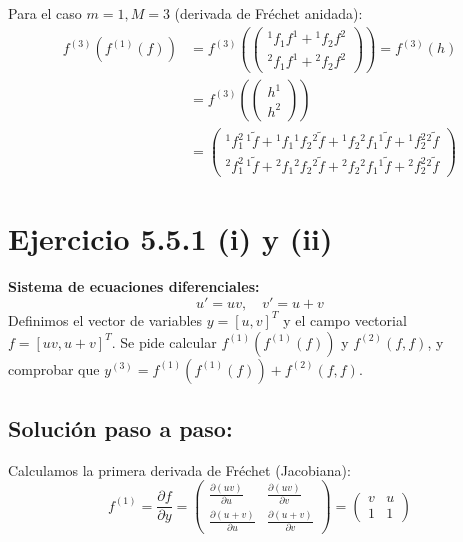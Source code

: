 Para el caso $m=1, M=3$ (derivada de Fréchet anidada):
\begin{align*}
    f^{(3)}\left(f^{(1)}(f)\right) &= f^{(3)}\left( \begin{pmatrix} {^1}f_1 f^1 + {^1}f_2 f^2 \\ {^2}f_1 f^1 + {^2}f_2 f^2 \end{pmatrix} \right) = f^{(3)}(h) \\
    &= f^{(3)}\left( \begin{pmatrix} h^1 \\ h^2 \end{pmatrix} \right) \\
    &= \begin{pmatrix} 
        {^1}f_1^2 \, {^1}\tilde{f} + {^1}f_1 {^1}f_2 {^2}\tilde{f} + {^1}f_2 {^2}f_1 {^1}\tilde{f} + {^1}f_2^2 {^2}\tilde{f} \\ 
        {^2}f_1^2 \, {^1}\tilde{f} + {^2}f_1 {^2}f_2 {^2}\tilde{f} + {^2}f_2 {^2}f_1 {^1}\tilde{f} + {^2}f_2^2 {^2}\tilde{f} 
    \end{pmatrix}
\end{align*}


























\section*{Ejercicio 5.5.1 (i) y (ii)}
\textbf{Sistema de ecuaciones diferenciales:}
$$ u' = uv, \quad v' = u + v $$
Definimos el vector de variables $y = [u, v]^T$ y el campo vectorial $f = [uv, u + v]^T$.
Se pide calcular $f^{(1)}(f^{(1)}(f))$ y $f^{(2)}(f, f)$, y comprobar que $y^{(3)} = f^{(1)}(f^{(1)}(f)) + f^{(2)}(f, f)$.

\subsection*{Solución paso a paso:}
Calculamos la primera derivada de Fréchet (Jacobiana):
$$ f^{(1)} = \frac{\partial f}{\partial y} = \begin{pmatrix} \frac{\partial(uv)}{\partial u} & \frac{\partial(uv)}{\partial v} \\ \frac{\partial(u+v)}{\partial u} & \frac{\partial(u+v)}{\partial v} \end{pmatrix} = \begin{pmatrix} v & u \\ 1 & 1 \end{pmatrix} $$

